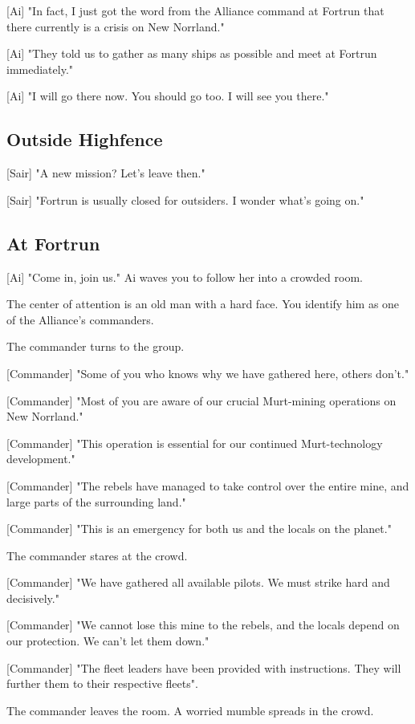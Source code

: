 \documentclass[a4paper,12pt]{article}
\begin{document}
[Ai] "In fact, I just got the word from the Alliance command at Fortrun that there currently is a crisis on New Norrland."

[Ai] "They told us to gather as many ships as possible and meet at Fortrun immediately."

[Ai] "I will go there now. You should go too. I will see you there."

\subsection{Outside Highfence}

[Sair] "A new mission? Let's leave then."

[Sair] "Fortrun is usually closed for outsiders. I wonder what's going on."

\subsection{At Fortrun}

[Ai] "Come in, join us." Ai waves you to follow her into a crowded room.

The center of attention is an old man with a hard face. You identify him
as one of the Alliance's commanders.

The commander turns to the group. 

[Commander] "Some of you who knows why we have gathered here,  others don't."

[Commander] "Most of you are aware of our crucial Murt-mining operations on New
Norrland." 

[Commander] "This operation is essential for our continued Murt-technology development."

[Commander] "The rebels have managed to take control over the entire mine, and large parts of the surrounding land." 

[Commander] "This is an emergency for both us and the locals on the planet."

The commander stares at the crowd. 

[Commander] "We have gathered all available pilots. We must strike hard and decisively."

[Commander] "We cannot lose this mine to the rebels, and the locals depend on our protection. We
can't let them down."

[Commander] "The fleet leaders have been provided with instructions. They will further them to
their respective fleets".

The commander leaves the room. A worried mumble spreads in the crowd.
\end{document}
